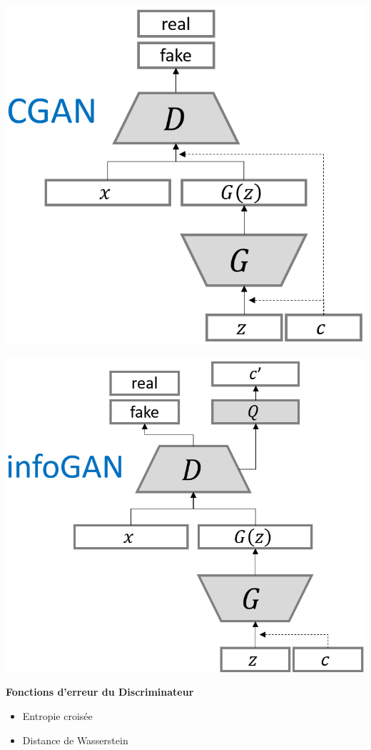 \documentclass[a0,portrait]{a0poster}
\newcommand{\subtitle}[1]{\Large{\textbf{#1}}}
\begin{document}
\begin{multicols}{2}
\begin{tcolorbox}[colback=blue!5!white,colframe=blue!75!black,title={\section*{Types de GANs}}]
\begin{center}
\begin{minipage}{0.31\textwidth}
    \includegraphics[width=1.0\textwidth]{./CGAN_structure.png}
\end{minipage}
\begin{minipage}{0.35\textwidth}
    \includegraphics[width=1.0\textwidth]{./INFOGAN_structure.png}
\end{minipage}
\end{center}
\subtitle{Fonctions d'erreur du Discriminateur}
\begin{itemize}
    \item Entropie croisée
    \item Distance de Wasserstein
\end{itemize}
\end{tcolorbox}
\bigskip


\end{multicols}
\end{document}
